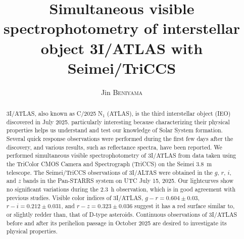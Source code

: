 \documentclass[]{pasj02}
\newcommand\gr{$g-r=0.604\pm0.03$\xspace}
\newcommand\ri{$r-i=0.212\pm0.031$\xspace}
\newcommand\rz{$r-z=0.323\pm0.036$\xspace}
\begin{document}
 

\title{Simultaneous visible spectrophotometry of interstellar object 3I/ATLAS with Seimei/TriCCS}

\author{
Jin \textsc{Beniyama}\altemailmark{}  
}


\maketitle

\begin{abstract}
3I/ATLAS, also known as C/2025 N$_1$ (ATLAS), is the third interstellar object (IEO) discovered in July 2025.
particularly interesting because characterizing their physical properties helps us understand and test our knowledge of Solar System formation.
Several quick response observations were performed during the first few days after the discovery, and various results, such as reflectance spectra, have been reported.
We performed simultaneous visible spectrophotometry of 3I/ATLAS from data taken using the TriColor CMOS Camera and Spectrograph (TriCCS) on the Seimei 3.8~m telescope.
The Seimei/TriCCS observations of 3I/ALTAS were obtained in the $g$, $r$, $i$, and $z$ bands in the Pan-STARRS system on UTC July 15, 2025.
Our lightcurves show no significant variations during the 2.3~h observation, which is in good agreement with previous studies.
Visible color indices of 3I/ATLAS, \gr, \ri, and \rz suggest it has a red surface similar to, or slightly redder than, that of D-type asteroids.
Continuous observations of 3I/ATLAS before and after its perihelion passage in October 2025 are desired to investigate its physical properties.
\end{abstract}

\pagewiselinenumbers 
\clearpage
\end{document}
